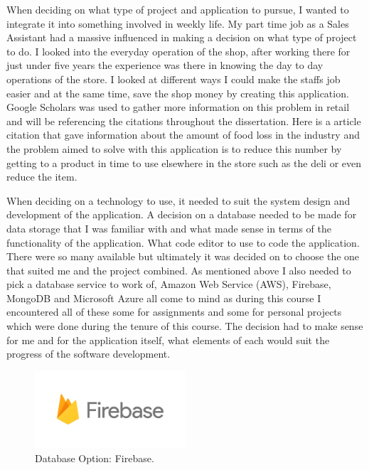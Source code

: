 \newpage

When deciding on what type of project and application to pursue, I wanted to integrate it into something involved in weekly life. My part time job as a Sales Assistant had a massive influenced in making a decision on what type of project to do. I looked into the everyday operation of the shop, after working there for just under five years the experience was there in knowing the day to day operations of the store. I looked at different ways I could make the staffs job easier and at the same time, save the shop money by creating this application. Google Scholars was used to gather more information on this problem in retail and will be referencing the citations throughout the dissertation. Here is a article citation that gave information about the amount of food loss in the industry and the problem aimed to solve with this application is to reduce this number by getting to a product in time to use elsewhere in the store such as the deli or even reduce the item. \cite{lebersorger2014food}
\newline

When deciding on a technology to use, it needed to suit the system design and development of the application. A decision on a database needed to be made for data storage that I was familiar with and what made sense in terms of the functionality of the application. What code editor to use to code the application. There were so many available but ultimately it was decided on to choose the one that suited me and the project combined. As mentioned above I also needed to pick a database service to work of, Amazon Web Service (AWS), Firebase, MongoDB and Microsoft Azure all come to mind as during this course I encountered all of these some for assignments and some for personal projects which were done during the tenure of this course. The decision had to make sense for me and for the application itself, what elements of each would suit the progress of the software development.
\newline

\begin{figure}[h!]
	\caption{Database Option: Firebase.}
	\label{image:firebase}
	\centering
	\includegraphics[width=0.5\textwidth]{images/firebase.png}
\end{figure}

